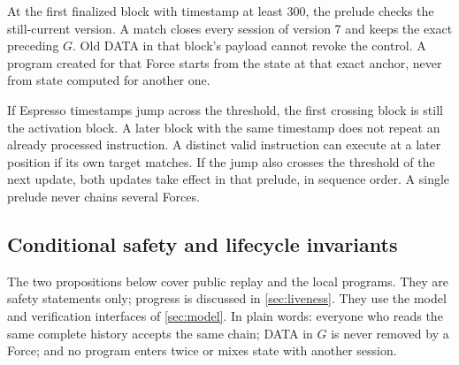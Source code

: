 \documentclass[11pt,a4paper]{article}
\begin{document}
At the first finalized block with timestamp at least 300, the prelude
checks the still-current version. A match closes every session of
version 7 and keeps the exact preceding $G$. Old DATA in that block's
payload cannot revoke the control. A program created for that
Force starts from the state at that exact anchor, never from state
computed for another one.

If Espresso timestamps jump across the threshold, the first crossing
block is still the activation block. A later block with the same
timestamp does not repeat an already processed instruction. A distinct
valid instruction can execute at a later position if its own target
matches. If the jump also crosses the threshold of the next update, both
updates take effect in that prelude, in sequence order. A single prelude
never chains several Forces.

\subsection{Conditional safety and lifecycle invariants}
\label{sec:safety-argument}
The two propositions below cover public replay and the local programs.
They are safety statements only; progress is discussed in
\cref{sec:liveness}. They use the model and verification interfaces of
\cref{sec:model}. In plain words: everyone who reads the same complete
history accepts the same chain; DATA in $G$ is never removed by a Force;
and no program enters twice or mixes state with another session.
\end{document}
